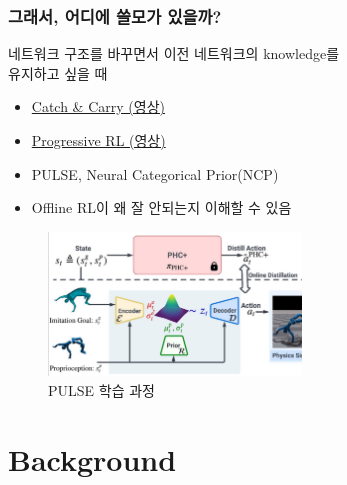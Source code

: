 \documentclass[11pt,xcolor={dvipsnames},hyperref={pdftex,pdfpagemode=UseNone,hidelinks,pdfdisplaydoctitle=true},usepdftitle=false]{beamer}
\begin{document}
\begin{frame}
\frametitle{그래서, 어디에 쓸모가 있을까?}

네트워크 구조를 바꾸면서 이전 네트워크의 knowledge를 \\ 
유지하고 싶을 때

\begin{itemize}
    \item {\href{https://www.youtube.com/watch?v=2rQAW-8gQQk}{Catch \& Carry (영상)}}
    \item {\href{https://www.youtube.com/watch?v=uCjQXowIChU}{Progressive RL (영상)}}
    \item PULSE, Neural Categorical Prior(NCP)
    \item Offline RL이 왜 잘 안되는지 이해할 수 있음
\end{itemize}

\begin{figure}
    \centering
    \includegraphics[width=0.6\textwidth]{figs/PULSE.png}
    \caption{PULSE 학습 과정}
\end{figure}

\end{frame}

\section{Background}
\end{document}
